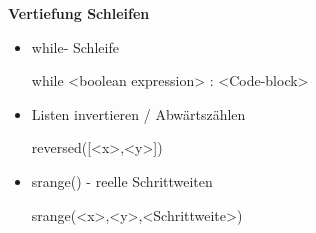 \documentclass[a4paper,9pt,DIV15,twocolumn]{scrartcl}
\begin{document}
\textbf{Vertiefung Schleifen}

\begin{itemize}
 \item while- Schleife
\begin{sagein}
while <boolean expression> :
    <Code-block>
\end{sagein}
\item Listen invertieren / Abwärtszählen
\begin{sagein}
reversed([<x>,<y>])
\end{sagein}
\item srange() - reelle Schrittweiten
\begin{sagein}
srange(<x>,<y>,<Schrittweite>) 
\end{sagein}
\end{itemize}
\end{document}
